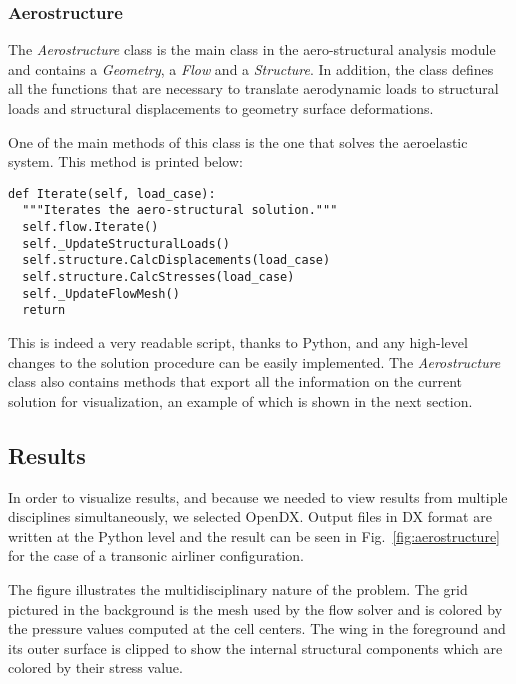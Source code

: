 \documentclass[twocolumn]{article}
\newcommand{\tthhide}[1]{#1}
\newcommand{\latexhide}[1]{}
\begin{document}
\subsubsection{Aerostructure}

The \emph{Aerostructure} class is the main class in the
aero-structural analysis module and contains a \emph{Geometry}, a
\emph{Flow} and a \emph{Structure}.  In addition, the class defines
all the functions that are necessary to translate aerodynamic
loads to structural loads and structural displacements to
geometry surface deformations.

One of the main methods of this class is the one that solves the
aeroelastic system. This method is printed below:
\begin{verbatim}
def Iterate(self, load_case):
  """Iterates the aero-structural solution."""
  self.flow.Iterate()
  self._UpdateStructuralLoads()
  self.structure.CalcDisplacements(load_case)
  self.structure.CalcStresses(load_case)
  self._UpdateFlowMesh()
  return
\end{verbatim}
This is indeed a very readable script, thanks to Python, and any
high-level changes to the solution procedure can be easily
implemented.
The \emph{Aerostructure} class also contains methods that export all
the information on the current solution for visualization, an example
of which is shown in the next section.


\subsection{Results}

In order to visualize results, and because we needed to view results
from multiple disciplines simultaneously, we selected OpenDX. Output
files in DX format are written at the Python level and the result can
be seen in Fig.~\ref{fig:aerostructure} for the case of a transonic
airliner configuration.
\tthhide{
\begin{figure*}[t]
  \centering 
  \epsfig{file=./aerostructure.eps, angle=-90, width=\linewidth} 
  \caption{Aero-structural model and results.}
  \label{fig:aerostructure}
\end{figure*}
}
\latexhide{
\begin{figure}[h]
  \label{fig:aerostructure}
\special{html:
<CENTER>
 <IMG SRC="aerostructure.jpg" WIDTH="600">
</CENTER>
}
  \caption{Aero-structural model and results.}
\end{figure}
}


The figure illustrates the multidisciplinary nature of the
problem. The grid pictured in the background is the mesh used by the
flow solver and is colored by the pressure values computed at the
cell centers. The wing in the foreground and its outer surface is
clipped to show the internal structural components which are colored
by their stress value.
\end{document}
